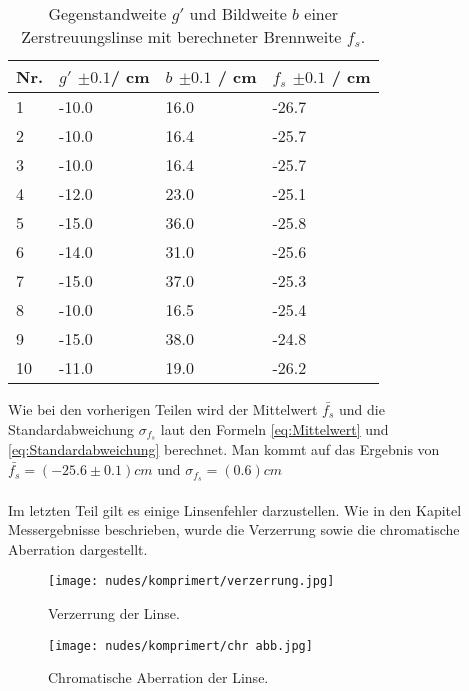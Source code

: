 \documentclass[12pt,a4paper,twoside]{article}
\begin{document}
\begin{table}[H]
    \centering
    \caption{Gegenstandweite $g'$ und Bildweite $b$ einer Zerstreuungslinse mit berechneter Brennweite $f_s$. }
    \label{tab:berechnung Zerstreuungslinse}
    \begin{tabular}{| l | l | l | l |}
        \hline
        Nr.  & $g'$ $\pm 0.1 $/ cm & $b$ $\pm 0.1 $ / cm & $f_s$ $\pm 0.1 $ / cm \\
        \hline
        1  & -10.0  & 16.0 & -26.7  \\
        2  & -10.0  & 16.4 & -25.7  \\
        3  & -10.0  & 16.4 & -25.7  \\
        4  & -12.0  & 23.0 & -25.1  \\
        5  & -15.0  & 36.0 & -25.8  \\
        6  & -14.0  & 31.0 & -25.6  \\
        7  & -15.0  & 37.0 & -25.3  \\
        8  & -10.0  & 16.5 & -25.4  \\
        9  & -15.0  & 38.0 & -24.8  \\
        10 & -11.0  & 19.0 & -26.2  \\
        \hline
    \end{tabular}
\end{table}

\noindent
Wie bei den vorherigen Teilen wird der Mittelwert $\bar{f_s}$ und die Standardabweichung $\sigma_{f_s}$ laut den Formeln \ref{eq:Mittelwert} und \ref{eq:Standardabweichung} berechnet. 
Man kommt auf das Ergebnis von $\bar{f_s} = (-25.6 \pm 0.1)cm$ und $\sigma_{f_s} = (0.6)cm$
\\
\\
Im letzten Teil gilt es einige Linsenfehler darzustellen. Wie in den Kapitel Messergebnisse beschrieben, wurde die Verzerrung sowie die chromatische Aberration dargestellt. 

\begin{figure}[H]
    \centering
    \texttt{[image: nudes/komprimert/verzerrung.jpg]}
    \caption{Verzerrung der Linse. }
    \label{fig:verzerrung}
\end{figure}

\begin{figure}[H]
    \centering
    \texttt{[image: nudes/komprimert/chr abb.jpg]}
    \caption{Chromatische Aberration der Linse. }
    \label{fig:chrom_Abb}
\end{figure}
\end{document}
